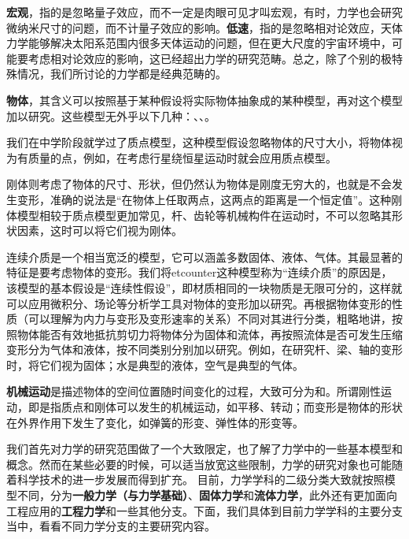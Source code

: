 \textbf{宏观}，指的是忽略量子效应，而不一定是肉眼可见才叫宏观，有时，力学也会研究微纳米尺寸的问题，而不计量子效应的影响。\textbf{低速}，指的是忽略相对论效应，天体力学能够解决太阳系范围内很多天体运动的问题，但在更大尺度的宇宙环境中，可能要考虑相对论效应的影响，这已经超出力学的研究范畴。总之，除了个别的极特殊情况，我们所讨论的力学都是经典范畴的。

\textbf{物体}，其含义可以按照基于某种假设将实际物体抽象成的某种模型，再对这个模型加以研究。这些模型无外乎以下几种：、、。

我们在中学阶段就学过了质点模型，这种模型假设忽略物体的尺寸大小，将物体视为有质量的点，例如，在考虑行星绕恒星运动时就会应用质点模型。

刚体则考虑了物体的尺寸、形状，但仍然认为物体是刚度无穷大的，也就是不会发生变形，准确的说法是“在物体上任取两点，这两点的距离是一个恒定值”。这种刚体模型相较于质点模型更加常见，杆、齿轮等机械构件在运动时，不可以忽略其形状因素，这时可以将它们视为刚体。

\begin{figwindow}
    连续介质是一个相当宽泛的模型，它可以涵盖多数固体、液体、气体。其最显著的特征是要考虑物体的变形。我们将etcounter这种模型称为“连续介质”的原因是，该模型的基本假设是“连续性假设”，即材质相同的一块物质是无限可分的，这样就可以应用微积分、场论等分析学工具对物体的变形加以研究。再根据物体变形的性质（可以理解为内力与变形及变形速率的关系）不同对其进行分类，粗略地讲，按照物体能否有效地抵抗剪切力将物体分为固体和流体，再按照流体是否可发生压缩变形分为气体和液体，按不同类别分别加以研究。例如，在研究杆、梁、轴的变形时，将它们视为固体；水是典型的液体，空气是典型的气体。
\end{figwindow}



\textbf{机械运动}是描述物体的空间位置随时间变化的过程，大致可分为和。所谓刚性运动，即是指质点和刚体可以发生的机械运动，如平移、转动；而变形是物体的形状在外界作用下发生了变化，如弹簧的形变、弹性体的形变等。

我们首先对力学的研究范围做了一个大致限定，也了解了力学中的一些基本模型和概念。然而在某些必要的时候，可以适当放宽这些限制，力学的研究对象也可能随着科学技术的进一步发展而得到扩充。
目前，力学学科的二级分类大致就按照模型不同，分为\textbf{一般力学（与力学基础）}、\textbf{固体力学}和\textbf{流体力学}，此外还有更加面向工程应用的\textbf{工程力学}和一些其他分支。下面，我们具体到目前力学学科的主要分支当中，看看不同力学分支的主要研究内容。

